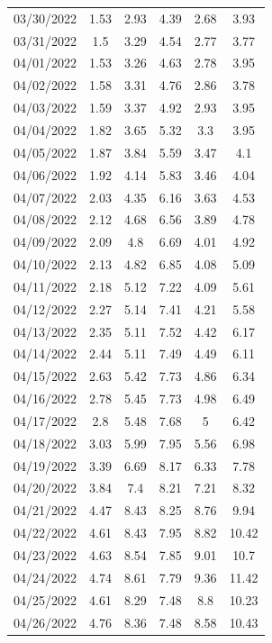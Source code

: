 \documentclass[withoutpreface,bwprint]{cumcmthesis} %
\begin{document}
\begin{appendices}
\begin{center}
\begin{longtable}{c|ccccc}
03/30/2022 & 1.53  & 2.93     & 4.39      & 2.68   & 3.93          \\
03/31/2022 & 1.5   & 3.29     & 4.54      & 2.77   & 3.77          \\
04/01/2022 & 1.53  & 3.26     & 4.63      & 2.78   & 3.95          \\
04/02/2022 & 1.58  & 3.31     & 4.76      & 2.86   & 3.78          \\
04/03/2022 & 1.59  & 3.37     & 4.92      & 2.93   & 3.95          \\
04/04/2022 & 1.82  & 3.65     & 5.32      & 3.3    & 3.95          \\
04/05/2022 & 1.87  & 3.84     & 5.59      & 3.47   & 4.1           \\
04/06/2022 & 1.92  & 4.14     & 5.83      & 3.46   & 4.04          \\
04/07/2022 & 2.03  & 4.35     & 6.16      & 3.63   & 4.53          \\
04/08/2022 & 2.12  & 4.68     & 6.56      & 3.89   & 4.78          \\
04/09/2022 & 2.09  & 4.8      & 6.69      & 4.01   & 4.92          \\
04/10/2022 & 2.13  & 4.82     & 6.85      & 4.08   & 5.09          \\
04/11/2022 & 2.18  & 5.12     & 7.22      & 4.09   & 5.61          \\
04/12/2022 & 2.27  & 5.14     & 7.41      & 4.21   & 5.58          \\
04/13/2022 & 2.35  & 5.11     & 7.52      & 4.42   & 6.17          \\
04/14/2022 & 2.44  & 5.11     & 7.49      & 4.49   & 6.11          \\
04/15/2022 & 2.63  & 5.42     & 7.73      & 4.86   & 6.34          \\
04/16/2022 & 2.78  & 5.45     & 7.73      & 4.98   & 6.49          \\
04/17/2022 & 2.8   & 5.48     & 7.68      & 5      & 6.42          \\
04/18/2022 & 3.03  & 5.99     & 7.95      & 5.56   & 6.98          \\
04/19/2022 & 3.39  & 6.69     & 8.17      & 6.33   & 7.78          \\
04/20/2022 & 3.84  & 7.4      & 8.21      & 7.21   & 8.32          \\
04/21/2022 & 4.47  & 8.43     & 8.25      & 8.76   & 9.94          \\
04/22/2022 & 4.61  & 8.43     & 7.95      & 8.82   & 10.42         \\
04/23/2022 & 4.63  & 8.54     & 7.85      & 9.01   & 10.7          \\
04/24/2022 & 4.74  & 8.61     & 7.79      & 9.36   & 11.42         \\
04/25/2022 & 4.61  & 8.29     & 7.48      & 8.8    & 10.23         \\
04/26/2022 & 4.76  & 8.36     & 7.48      & 8.58   & 10.43 
\\
\bottomrule
\end{longtable}
\end{center}


\end{appendices}
\end{document}
